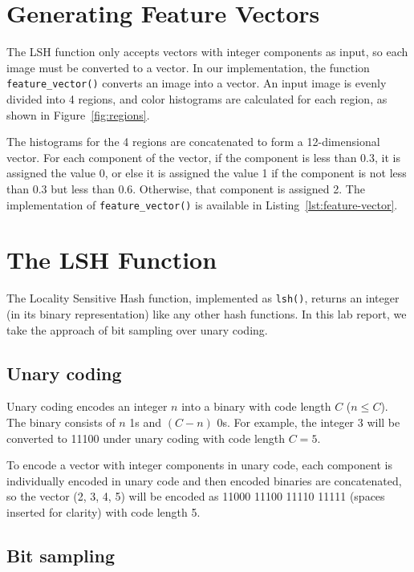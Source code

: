 \documentclass{ee208report}
\begin{document}
\begin{multicols*}{2}
\section{Generating Feature Vectors}

The LSH function only accepts vectors with integer components as input, so each
image must be converted to a vector. In our implementation, the function
\texttt{feature\_vector()} converts an image into a vector. An input image is
evenly divided into 4 regions, and color histograms are calculated for each
region, as shown in Figure~\ref{fig:regions}. 

The histograms for the 4 regions are concatenated to form a 12-dimensional
vector. For each component of the vector, if the component is less than 0.3, it
is assigned the value 0, or else it is assigned the value 1 if the component is
not less than 0.3 but less than 0.6. Otherwise, that component is assigned 2.
The implementation of \texttt{feature\_vector()} is available in
Listing~\ref{lst:feature-vector}.

\section{The LSH Function}

The Locality Sensitive Hash function, implemented as \texttt{lsh()}, returns an
integer (in its binary representation) like any other hash functions. In this
lab report, we take the approach of bit sampling over unary coding.

\subsection{Unary coding}

Unary coding encodes an integer $n$ into a binary with code length $C$ ($n \leq
C$). The binary consists of $n$ 1s and $(C - n)$ 0s. For example, the integer 3
will be converted to 11100 under unary coding with code length $C = 5$.

To encode a vector with integer components in unary code, each component is
individually encoded in unary code and then encoded binaries are concatenated,
so the vector (2, 3, 4, 5) will be encoded as 11000 11100 11110 11111 (spaces
inserted for clarity) with code length 5.

\subsection{Bit sampling}


\end{multicols*}
\end{document}
